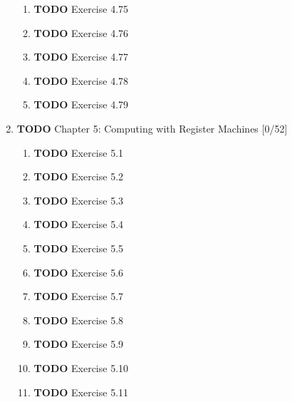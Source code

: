 \documentclass[11pt]{article}
\begin{document}
\begin{enumerate}
\begin{enumerate}
\item {\bfseries\sffamily TODO} Exercise 4.75
\label{sec:org8d72abb}

\item {\bfseries\sffamily TODO} Exercise 4.76
\label{sec:org0de341a}

\item {\bfseries\sffamily TODO} Exercise 4.77
\label{sec:orge692ab5}

\item {\bfseries\sffamily TODO} Exercise 4.78
\label{sec:orgbeca3bf}

\item {\bfseries\sffamily TODO} Exercise 4.79
\label{sec:org7abdff4}
\end{enumerate}

\item {\bfseries\sffamily TODO} Chapter 5: Computing with Register Machines [0/52]
\label{sec:orgcf8e7a8}

\begin{enumerate}
\item {\bfseries\sffamily TODO} Exercise 5.1
\label{sec:orgbf9b726}

\item {\bfseries\sffamily TODO} Exercise 5.2
\label{sec:org930858b}

\item {\bfseries\sffamily TODO} Exercise 5.3
\label{sec:orgbb83fb9}

\item {\bfseries\sffamily TODO} Exercise 5.4
\label{sec:orgde477f6}

\item {\bfseries\sffamily TODO} Exercise 5.5
\label{sec:orgdb2f804}

\item {\bfseries\sffamily TODO} Exercise 5.6
\label{sec:org5996891}

\item {\bfseries\sffamily TODO} Exercise 5.7
\label{sec:org9a8f461}

\item {\bfseries\sffamily TODO} Exercise 5.8
\label{sec:org1bf2cbc}

\item {\bfseries\sffamily TODO} Exercise 5.9
\label{sec:org85abaa9}

\item {\bfseries\sffamily TODO} Exercise 5.10
\label{sec:orge4a541c}

\item {\bfseries\sffamily TODO} Exercise 5.11
\label{sec:orgcab0524}


\end{enumerate}
\end{enumerate}
\end{document}
